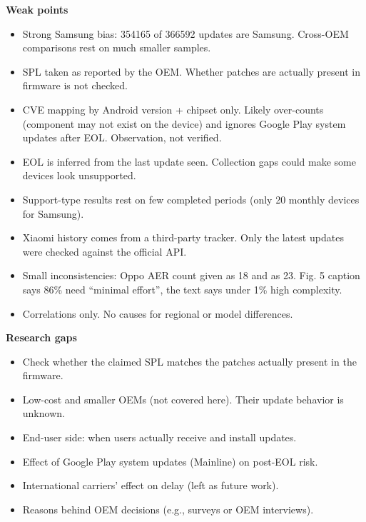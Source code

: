 \documentclass[11pt,a4paper]{article}
\begin{document}
\begin{enumerate}
    \vspace{4pt}
    \textbf{Weak points}
    \begin{itemize}
        \item Strong Samsung bias: 354165 of 366592 updates are Samsung. Cross-OEM comparisons rest on much smaller samples.
        \item SPL taken as reported by the OEM. Whether patches are actually present in firmware is not checked.
        \item CVE mapping by Android version + chipset only. Likely over-counts (component may not exist on the device) and ignores Google Play system updates after EOL. Observation, not verified.
        \item EOL is inferred from the last update seen. Collection gaps could make some devices look unsupported.
        \item Support-type results rest on few completed periods (only 20 monthly devices for Samsung).
        \item Xiaomi history comes from a third-party tracker. Only the latest updates were checked against the official API.
        \item Small inconsistencies: Oppo AER count given as 18 and as 23. Fig. 5 caption says 86\% need ``minimal effort'', the text says under 1\% high complexity.
        \item Correlations only. No causes for regional or model differences.
    \end{itemize}

    \vspace{4pt}
    \textbf{Research gaps}
    \begin{itemize}
        \item Check whether the claimed SPL matches the patches actually present in the firmware.
        \item Low-cost and smaller OEMs (not covered here). Their update behavior is unknown.
        \item End-user side: when users actually receive and install updates.
        \item Effect of Google Play system updates (Mainline) on post-EOL risk.
        \item International carriers' effect on delay (left as future work).
        \item Reasons behind OEM decisions (e.g., surveys or OEM interviews).
    \end{itemize}

\end{enumerate}
\end{document}
